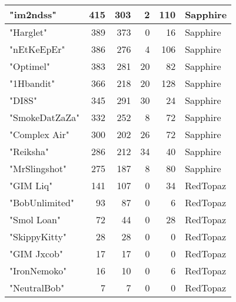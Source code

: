 \documentclass{article}
\begin{document}
\begin{table}[htbp]
\begin{tabular}{|l|r|r|r|r|l|}
"im2ndss" & 415 & 303 & 2 & 110 & Sapphire \\ \hline
"Harglet" & 389 & 373 & 0 & 16 & Sapphire \\ \hline
"nEtKeEpEr" & 386 & 276 & 4 & 106 & Sapphire \\ \hline
"Optimel" & 383 & 281 & 20 & 82 & Sapphire \\ \hline
"1Hbandit" & 366 & 218 & 20 & 128 & Sapphire \\ \hline
"DI8S" & 345 & 291 & 30 & 24 & Sapphire \\ \hline
"SmokeDatZaZa" & 332 & 252 & 8 & 72 & Sapphire \\ \hline
"Complex Air" & 300 & 202 & 26 & 72 & Sapphire \\ \hline
"Reiksha" & 286 & 212 & 34 & 40 & Sapphire \\ \hline
"MrSlingshot" & 275 & 187 & 8 & 80 & Sapphire \\ \hline
"GIM Liq" & 141 & 107 & 0 & 34 & RedTopaz \\ \hline
"BobUnlimited" & 93 & 87 & 0 & 6 & RedTopaz \\ \hline
"Smol Loan" & 72 & 44 & 0 & 28 & RedTopaz \\ \hline
"SkippyKitty" & 28 & 28 & 0 & 0 & RedTopaz \\ \hline
"GIM Jxcob" & 17 & 17 & 0 & 0 & RedTopaz \\ \hline
"IronNemoko" & 16 & 10 & 0 & 6 & RedTopaz \\ \hline
"NeutralBob" & 7 & 7 & 0 & 0 & RedTopaz \\ \hline
\end{tabular}
\end{table}
\end{document}
